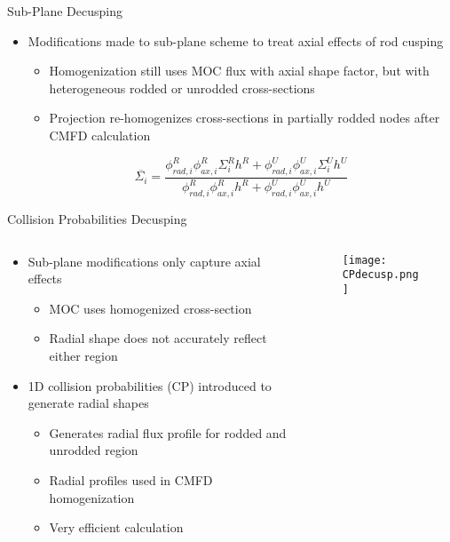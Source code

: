 \begin{frame}[t]{Sub-Plane Decusping}
    
\begin{itemize}
    \item Modifications made to sub-plane scheme to treat axial effects of rod 
    cusping
    \begin{itemize}
      \item Homogenization still uses MOC flux with axial shape factor, but 
      with heterogeneous rodded or unrodded cross-sections
      \item Projection re-homogenizes cross-sections in partially rodded nodes 
      after CMFD calculation
    \end{itemize}
    \begin{equation}\label{e:nTRACERdecusping}
    \overline{\Sigma_i} = \frac{\phi_{rad,i}^R \phi_{ax,i}^R \Sigma_i^R h^R + \phi_{rad,i}^U \phi_{ax,i}^U \Sigma_i^U h^U}{\phi_{rad,i}^R \phi_{ax,i}^R h^R + \phi_{rad,i}^U \phi_{ax,i}^U h^U} \nonumber
    \end{equation}
\end{itemize}
    
\end{frame}


\begin{frame}[t]{Collision Probabilities Decusping}
    
\begin{columns}
    \begin{column}{0.45\textwidth}
      \begin{itemize}
        \item Sub-plane modifications only capture axial effects
        \begin{itemize}
          \item MOC uses homogenized cross-section
          \item Radial shape does not accurately reflect either region
        \end{itemize}
        \item 1D collision probabilities (CP) introduced to generate radial 
        shapes
        \begin{itemize}
          \item Generates radial flux profile for rodded and unrodded region
          \item Radial profiles used in CMFD homogenization
          \item Very efficient calculation
        \end{itemize}
      \end{itemize}
    \end{column}
    \begin{column}{0.55\textwidth}
    \begin{figure}[h]
      \centering
      \texttt{[image: CPdecusp.png]}
    \end{figure}
\end{column}
\end{columns}
    
\end{frame}